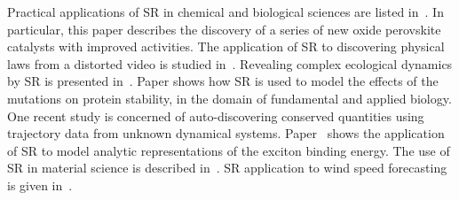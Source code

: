 \documentclass[a4paper,12pt]{elsarticle}
\begin{document}
	Practical applications of SR in chemical and biological sciences are listed in~\cite{weng2020simple}. In particular, this paper describes the discovery of a series of new oxide perovskite catalysts with improved activities. The application of SR to discovering physical laws from a distorted video is studied in~\cite{udrescu2021symbolic}. Revealing complex ecological dynamics by SR is presented in~\cite{chen2019revealing}. Paper \cite{louis2021reviewing} shows how SR is used to model the effects of the mutations on protein stability, in the domain of fundamental and applied biology. One recent study \cite{liu2021machine} is concerned of auto-discovering conserved quantities using trajectory data from unknown dynamical systems. Paper~\cite{liang2019phillips} shows the application of SR to model analytic representations of the exciton binding energy. The use of SR in material science is described in~\cite{wang2019symbolic,wang2022symbolic,burlacu2022symbolic,kabliman2021application}. SR application to wind speed forecasting is given in~\cite{abdellaoui2021symbolic}. 
	
\end{document}
